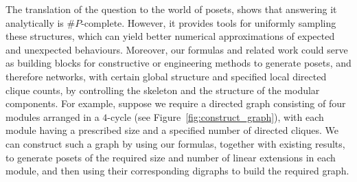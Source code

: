 \documentclass[9pt,a4paper,oneside]{article}
\begin{document}
The translation of the question to the world of posets, shows that answering it analytically is $\#P$-complete.
However, it provides tools for uniformly sampling these structures, which can yield better numerical approximations of expected and unexpected behaviours.
Moreover, our formulas and related work could serve as building blocks for constructive or engineering methods to generate posets, and therefore networks, with certain global structure and specified local directed clique counts, by controlling the skeleton and the structure of the modular components. For example, suppose we require a directed graph consisting of four modules arranged in a $4$-cycle (see Figure~\ref{fig:construct_graph}), with each module having a prescribed size and a specified number of directed cliques. We can construct such a graph by using our formulas, together with existing results, to generate posets of the required size and number of linear extensions in each module, and then using their corresponding digraphs to build the required graph.
\end{document}
